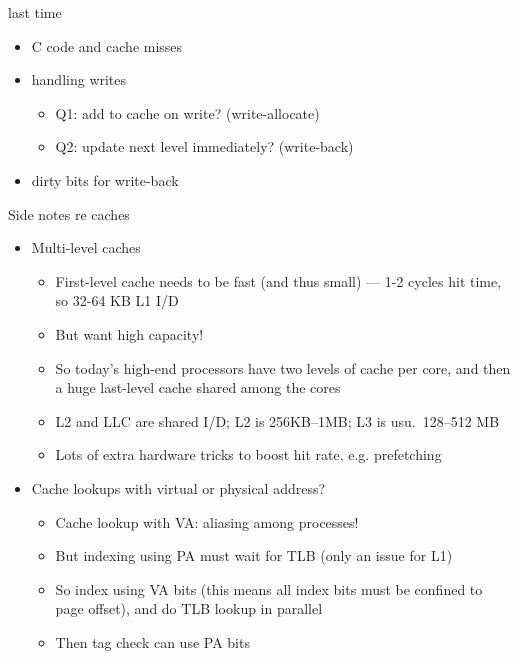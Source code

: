 \date{}
\title{}
\date{}

\begin{frame}
    \titlepage
\end{frame}


\usetikzlibrary{calc}

\begin{frame}{last time}
    \begin{itemize}
    \item C code and cache misses
    \item handling writes
        \begin{itemize}
        \item Q1: add to cache on write? (write-allocate)
        \item Q2: update next level immediately? (write-back)
        \end{itemize}
    \item dirty bits for write-back
    \end{itemize}
\end{frame}

\begin{frame}{Side notes re caches}
  \begin{itemize}
  \item Multi-level caches
      \begin{itemize}
      \item First-level cache needs to be fast (and thus small) --- 1-2 cycles hit time, so 32-64 KB L1 I/D
      \item But want high capacity!
      \item So today's high-end processors have two levels of cache per core, and then a huge last-level cache shared among the cores
      \item L2 and LLC are shared I/D; L2 is 256KB--1MB; L3 is usu.\ 128--512 MB
      \item Lots of extra hardware tricks to boost hit rate, e.g. prefetching
      \end{itemize}
  \item Cache lookups with virtual or physical address?
      \begin{itemize}
      \item Cache lookup with VA: aliasing among processes!
      \item But indexing using PA must wait for TLB (only an issue for L1)
      \item So index using VA bits (this means all index bits must be confined to page offset), and do TLB lookup in parallel
      \item Then tag check can use PA bits
     \end{itemize}
  \end{itemize}
\end{frame}

